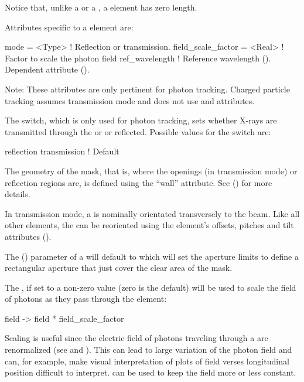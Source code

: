 {Notice that, unlike a  or a , a  element has zero length.

Attributes specific to a  element are:
\begin{example}
  mode               = <Type>   ! Reflection or transmission.
  field_scale_factor = <Real>   ! Factor to scale the photon field
  ref_wavelength                ! Reference wavelength (). Dependent attribute ().
\end{example}

Note: These attributes are only pertinent for photon tracking. Charged
particle tracking assumes transmission mode and does not use
 and  attributes.

The  switch, which is only used for photon tracking, sets
whether X-rays are transmitted through the  or
or reflected. Possible values for the  switch are:
\begin{example}
  reflection
  transmission        ! Default
\end{example}

The geometry of the mask, that is, where the openings (in
transmission mode) or reflection regions are, is defined using the
``wall'' attribute. See () for more details.

In transmission mode, a  is nominally orientated
transversely to the beam. Like all other elements, the
 can be reoriented using the element's offsets,
pitches and tilt attributes ().

The  () parameter of a
 will default to  which will set the
aperture limits to define a rectangular aperture that just cover the
clear area of the mask.

The , if set to a non-zero value (zero is the
default) will be used to scale the field of photons as they pass through
the  element:
\begin{example}
  field -> field * field_scale_factor
\end{example}
Scaling is useful since the electric field of photons traveling through a
 are renormalized (see  and
). This can lead to large variation of the photon field and
can, for example, make visual interpretation of plots of field verses
longitudinal position difficult to interpret. 
can be used to keep the field more or less constant.

}
